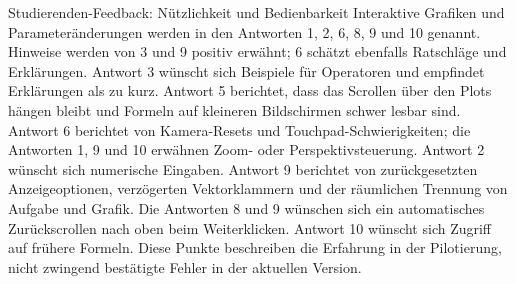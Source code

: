 \begin{frame}{Studierenden-Feedback: Nützlichkeit und Bedienbarkeit}
{Interaktive Grafiken und Parameteränderungen werden in den Antworten 1, 2, 6, 8, 9 und 10 genannt. Hinweise werden von 3 und 9 positiv erwähnt; 6 schätzt ebenfalls Ratschläge und Erklärungen. Antwort 3 wünscht sich Beispiele für Operatoren und empfindet Erklärungen als zu kurz. Antwort 5 berichtet, dass das Scrollen über den Plots hängen bleibt und Formeln auf kleineren Bildschirmen schwer lesbar sind. Antwort 6 berichtet von Kamera-Resets und Touchpad-Schwierigkeiten; die Antworten 1, 9 und 10 erwähnen Zoom- oder Perspektivsteuerung. Antwort 2 wünscht sich numerische Eingaben. Antwort 9 berichtet von zurückgesetzten Anzeigeoptionen, verzögerten Vektorklammern und der räumlichen Trennung von Aufgabe und Grafik. Die Antworten 8 und 9 wünschen sich ein automatisches Zurückscrollen nach oben beim Weiterklicken. Antwort 10 wünscht sich Zugriff auf frühere Formeln. Diese Punkte beschreiben die Erfahrung in der Pilotierung, nicht zwingend bestätigte Fehler in der aktuellen Version.}
\end{frame}

